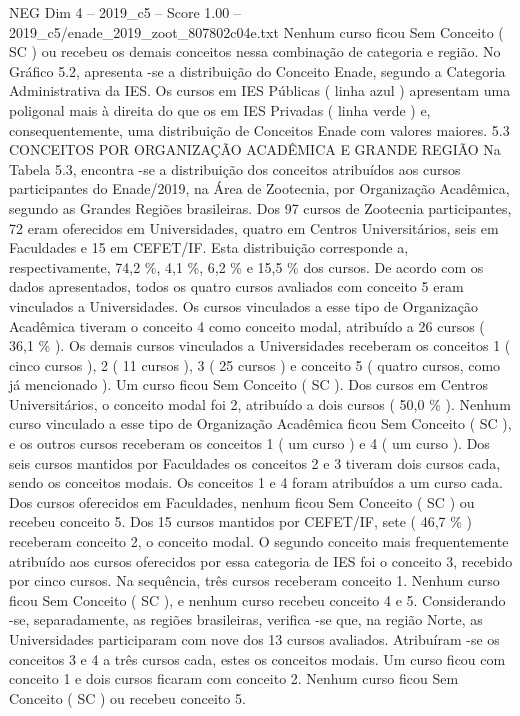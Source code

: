 \begin{textsample}{NEG Dim 4 – 2019\_c5 – Score 1.00 – 2019\_c5/enade\_2019\_zoot\_807802c04e.txt}
Nenhum curso ficou Sem Conceito ( SC ) ou recebeu os demais conceitos nessa combinação de categoria e região.
No Gráfico 5.2, apresenta -se a distribuição do Conceito Enade, segundo a Categoria Administrativa da IES.
Os cursos em IES Públicas ( linha azul ) apresentam uma poligonal mais à direita do que os em IES Privadas ( linha verde ) e, consequentemente, uma distribuição de Conceitos Enade com valores maiores. 5.3 CONCEITOS POR ORGANIZAÇÃO ACADÊMICA E GRANDE REGIÃO Na Tabela 5.3, encontra -se a distribuição dos conceitos atribuídos aos cursos participantes do Enade/2019, na Área de Zootecnia, por Organização Acadêmica, segundo as Grandes Regiões brasileiras.
Dos 97 cursos de Zootecnia participantes, 72 eram oferecidos em Universidades, quatro em Centros Universitários, seis em Faculdades e 15 em CEFET/IF.
Esta distribuição corresponde a, respectivamente, 74,2 \%, 4,1 \%, 6,2 \% e 15,5 \% dos cursos.
De acordo com os dados apresentados, todos os quatro cursos avaliados com conceito 5 eram vinculados a Universidades.
Os cursos vinculados a esse tipo de Organização Acadêmica tiveram o conceito 4 como conceito modal, atribuído a 26 cursos ( 36,1 \% ).
Os demais cursos vinculados a Universidades receberam os conceitos 1 ( cinco cursos ), 2 ( 11 cursos ), 3 ( 25 cursos ) e conceito 5 ( quatro cursos, como já mencionado ).
Um curso ficou Sem Conceito ( SC ).
Dos cursos em Centros Universitários, o conceito modal foi 2, atribuído a dois cursos ( 50,0 \% ).
Nenhum curso vinculado a esse tipo de Organização Acadêmica ficou Sem Conceito ( SC ), e os outros cursos receberam os conceitos 1 ( um curso ) e 4 ( um curso ).
Dos seis cursos mantidos por Faculdades os conceitos 2 e 3 tiveram dois cursos cada, sendo os conceitos modais.
Os conceitos 1 e 4 foram atribuídos a um curso cada.
Dos cursos oferecidos em Faculdades, nenhum ficou Sem Conceito ( SC ) ou recebeu conceito 5.
Dos 15 cursos mantidos por CEFET/IF, sete ( 46,7 \% ) receberam conceito 2, o conceito modal.
O segundo conceito mais frequentemente atribuído aos cursos oferecidos por essa categoria de IES foi o conceito 3, recebido por cinco cursos.
Na sequência, três cursos receberam conceito 1.
Nenhum curso ficou Sem Conceito ( SC ), e nenhum curso recebeu conceito 4 e 5.
Considerando -se, separadamente, as regiões brasileiras, verifica -se que, na região Norte, as Universidades participaram com nove dos 13 cursos avaliados.
Atribuíram -se os conceitos 3 e 4 a três cursos cada, estes os conceitos modais.
Um curso ficou com conceito 1 e dois cursos ficaram com conceito 2.
Nenhum curso ficou Sem Conceito ( SC ) ou recebeu conceito 5.

\end{textsample}
